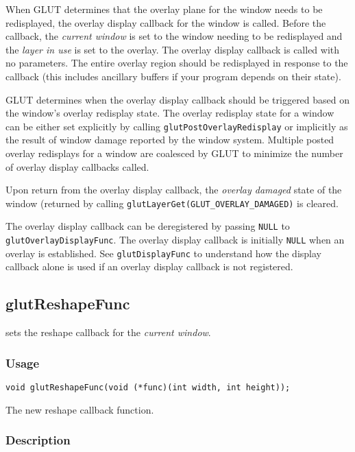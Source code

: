 When GLUT determines that the overlay plane for the window needs
to be redisplayed, the overlay display callback for the window is called.  Before the callback,
the {\em current window} is set to the window needing to be
redisplayed and the {\em layer in use} is set to the overlay.  The overlay display callback
is called with no parameters.  The
entire overlay region should be redisplayed in response to the callback (this
includes ancillary buffers if your program depends on their state).

GLUT determines when the overlay display callback should be triggered based on
the window's overlay redisplay state.  The overlay redisplay state for a window can
be either set explicitly by calling {\tt glutPostOverlayRedisplay} or implicitly
as the result of window damage reported by the window system.
Multiple posted overlay redisplays for a window are
coalesced by GLUT to minimize the number of overlay display callbacks called.

Upon return from the overlay display callback, the {\em overlay damaged} state of the
window (returned by calling {\tt glutLayerGet(GLUT\_OVERLAY\_DAMAGED)}
is cleared.

The overlay display callback can be deregistered by passing {\tt NULL} to
{\tt glutOverlayDisplayFunc}.  The overlay display callback is initially {\tt NULL}
when an overlay is established.
See {\tt glutDisplayFunc} to understand how the
display callback alone is used if an overlay display callback is not registered.

\subsection{glutReshapeFunc}

 sets the reshape callback for the {\em current window}.

\subsubsection*{Usage}
\begin{verbatim}
void glutReshapeFunc(void (*func)(int width, int height));
\end{verbatim}
\begin{description}
\itemsep 0in
\item[{\tt func}]
The new reshape callback function.
\end{description}

\subsubsection*{Description}

